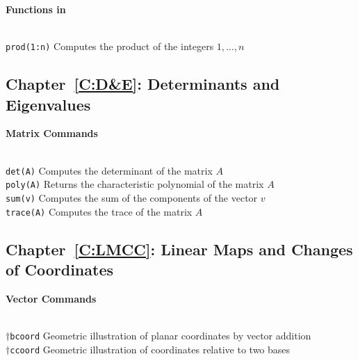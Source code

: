 \documentclass{ximera}
\begin{document}
\centerline{
{\bf Functions in \Matlab}
} \vspace*{-0.1in}

\begin{tabbing}
 \hspace{1.1in} \= \\

        {\tt prod(1:n)}   \>
Computes the product of the integers $1,\ldots,n$
\end{tabbing}


\subsection*{Chapter~\ref{C:D&E}: Determinants and Eigenvalues}

\centerline{
{\bf Matrix Commands}
} \vspace*{-0.1in}
 
\begin{tabbing}
 \hspace{1.2in} \= \\

     {\tt det(A)}   \>
 Computes the determinant of the matrix $A$   \\

     {\tt poly(A)}   \>
 Returns the characteristic polynomial 
			of the matrix $A$   \\
     {\tt sum(v)}   \>
 Computes the sum of the components of the vector $v$   \\

     {\tt trace(A)}   \>
 Computes the trace of the matrix $A$  



\end{tabbing}



\subsection*{Chapter~\ref{C:LMCC}: Linear Maps and Changes of Coordinates}


\centerline{
{\bf Vector Commands}
} \vspace*{-0.1in}
 
\begin{tabbing}
 \hspace{1.1in} \= \\

     $\dagger${\tt bcoord}   \>
 Geometric illustration of planar coordinates
			by vector addition   \\
 
     $\dagger${\tt ccoord}   \>
 Geometric illustration of coordinates relative to two bases   

\end{tabbing}
\end{document}
